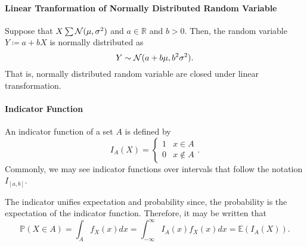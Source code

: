 \paragraph{Linear Tranformation of Normally Distributed Random Variable}
Suppose that \(X \sum \mathcal{N}(\mu, \sigma^2)\)
and \(a \in \mathbb{R}\) and \(b > 0\).
Then, the random variable \(Y \coloneqq a + bX\) is normally
distributed as
\[
    Y\sim \mathcal{N}(a + b\mu, b^2 \sigma^2).
\]
That is, normally distributed random variable are closed
under linear transformation.

\paragraph{Indicator Function}
An indicator function of a set \(A\) is defined by \[ 
    I_A(X) = \begin{cases}
        1 & x \in A \\
        0 & x \not\in A
    \end{cases}
.\]
Commonly, we may see indicator functions over intervals that follow the notation
\(I_{[a, b]}\).

The indicator unifies expectation and probability since, the probability
is the expectation of the indicator function.
Therefore, it may be written that \[
    \mathbb{P}(X\in A) = \int_{A} f_X(x)dx
    = \int_{-\infty}^{\infty} I_A(x) f_X(x) dx = \mathbb{E}(I_A(X))
.\]



